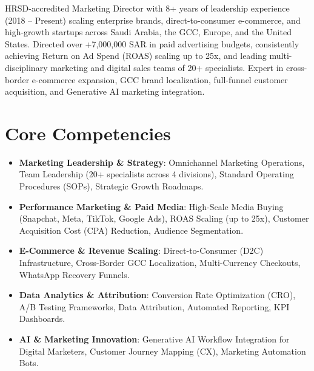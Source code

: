 \documentclass[11pt,a4paper,sans]{moderncv}
\begin{document}
\makecvtitle


\vspace{4pt}
\small{HRSD-accredited Marketing Director with 8+ years of leadership experience (2018 -- Present) scaling enterprise brands, direct-to-consumer e-commerce, and high-growth startups across Saudi Arabia, the GCC, Europe, and the United States. Directed over +7,000,000 SAR in paid advertising budgets, consistently achieving Return on Ad Spend (ROAS) scaling up to 25x, and leading multi-disciplinary marketing and digital sales teams of 20+ specialists. Expert in cross-border e-commerce expansion, GCC brand localization, full-funnel customer acquisition, and Generative AI marketing integration.}


\section{Core Competencies}
\vspace{1pt}
\begin{itemize}

\item \textbf{Marketing Leadership \& Strategy}: Omnichannel Marketing Operations, Team Leadership (20+ specialists across 4 divisions), Standard Operating Procedures (SOPs), Strategic Growth Roadmaps.

\item \textbf{Performance Marketing \& Paid Media}: High-Scale Media Buying (Snapchat, Meta, TikTok, Google Ads), ROAS Scaling (up to 25x), Customer Acquisition Cost (CPA) Reduction, Audience Segmentation.

\item \textbf{E-Commerce \& Revenue Scaling}: Direct-to-Consumer (D2C) Infrastructure, Cross-Border GCC Localization, Multi-Currency Checkouts, WhatsApp Recovery Funnels.

\item \textbf{Data Analytics \& Attribution}: Conversion Rate Optimization (CRO), A/B Testing Frameworks, Data Attribution, Automated Reporting, KPI Dashboards.

\item \textbf{AI \& Marketing Innovation}: Generative AI Workflow Integration for Digital Marketers, Customer Journey Mapping (CX), Marketing Automation Bots.

\end{itemize}
\end{document}
